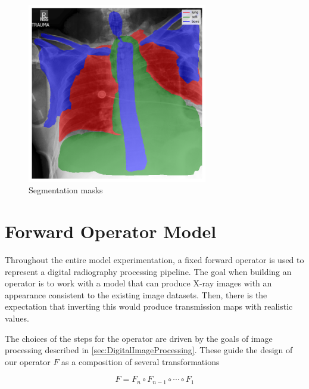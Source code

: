 \documentclass[nomenclature, english, bibtex]{kththesis}
\numberwithin{listing}{chapter}
\begin{document}


\begin{figure}[H]
    \centering
    \includegraphics[width=0.7\textwidth]{figures/segmentation_masks.png}
    \caption{Segmentation masks}
    \label{fig:segmentationMasks}
\end{figure}

\section{Forward Operator Model}

Throughout the entire model experimentation, a fixed forward operator is used to represent a
digital radiography processing pipeline. The goal when building an operator is to work with a
model that can produce X-ray images with an appearance consistent to the existing image datasets.
Then, there is the expectation that inverting this would produce transmission maps with realistic
values.

The choices of the steps for the operator are driven by the goals of image processing described
in \autoref{sec:DigitalImageProcessing}. These guide the design of our operator $F$ as a composition
of several transformations

\begin{equation}
F = F_n \circ F_{n-1} \circ \cdots \circ F_1
\end{equation}
\end{document}
